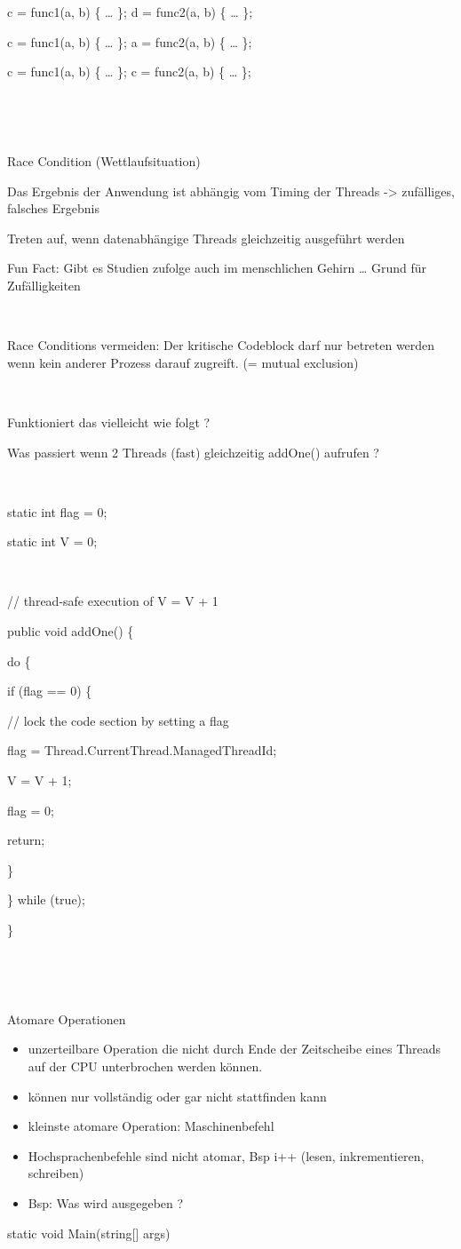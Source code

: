 c = func1(a, b) \{ … \};  d = func2(a, b) \{ … \};

c = func1(a, b) \{ … \};  a = func2(a, b) \{ … \};

c = func1(a, b) \{ … \};  c = func2(a, b) \{ … \};

~

~

Race Condition (Wettlaufsituation)

Das Ergebnis der Anwendung ist abhängig vom Timing der Threads -{\textgreater} zufälliges, falsches Ergebnis

Treten auf, wenn datenabhängige Threads gleichzeitig ausgeführt werden

Fun Fact: Gibt es Studien zufolge auch im menschlichen Gehirn … Grund für Zufälligkeiten 

~

Race Conditions vermeiden: Der kritische Codeblock darf nur betreten werden wenn kein anderer Prozess darauf zugreift. (= mutual exclusion)

~

Funktioniert das vielleicht wie folgt ? 

Was passiert wenn 2 Threads (fast) gleichzeitig addOne() aufrufen ? 

~

static int flag = 0; 

static int V = 0; 

~

// thread-safe execution of V = V + 1

public void addOne() \{ 

 do \{ 

 if (flag == 0) \{ 

 // lock the code section by setting a flag 

 flag = Thread.CurrentThread.ManagedThreadId; 

 V = V + 1; 

 flag = 0; 

 return;  

 \} 

 \} while (true); 

\}

~

~

Atomare Operationen

\begin{itemize}
\item unzerteilbare Operation die nicht durch Ende der Zeitscheibe eines Threads auf der CPU unterbrochen werden können. 
\item können nur vollständig oder gar nicht stattfinden kann
\item kleinste atomare Operation: Maschinenbefehl
\item Hochsprachenbefehle sind nicht atomar, Bsp i++ (lesen, inkrementieren, schreiben)
\item Bsp: Was wird ausgegeben ? 
\end{itemize}
 static void Main(string[] args)

